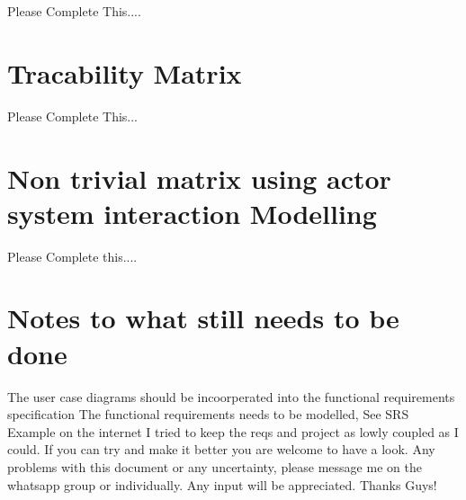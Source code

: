 \documentclass{article}
\begin{document}
Please Complete This....

\newpage
\centering
\section{Tracability Matrix}
 
Please Complete This...

\newpage
\centering
\section{Non trivial matrix using actor system interaction Modelling}
 
Please Complete this....

\section{Notes to what still needs to be done}
The user case diagrams should be incoorperated into the functional requirements specification
The functional requirements needs to be modelled, See SRS Example on the internet 
I tried to keep the reqs and project as lowly coupled as I could. If you can try and make it better you are welcome to have a look.
Any problems with this document or any uncertainty, please message me on the whatsapp group or individually.
Any input will be appreciated.
Thanks Guys!
\end{document}
